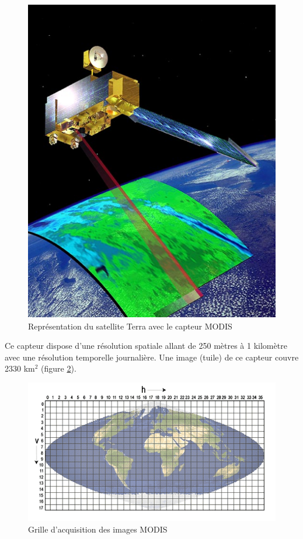 \documentclass[10pt,a4paper]{article}
\begin{document}
\begin{figure}[!h]
\centering
\includegraphics[scale=0.4]{img/modis.png}
\caption{Représentation du satellite Terra avec le capteur MODIS}
\label{modis}
\end{figure}

Ce capteur dispose d'une résolution spatiale allant de 250 mètres à 1 kilomètre avec une résolution temporelle journalière. Une image (tuile) de ce capteur couvre 2330 km$^2$ (figure \ref{modisGrid}).

\begin{figure}[!h]
\centering
\includegraphics[scale=0.7]{img/modisGrid.png}
\caption{Grille d'acquisition des images MODIS}
\label{modisGrid}
\end{figure}
\end{document}
